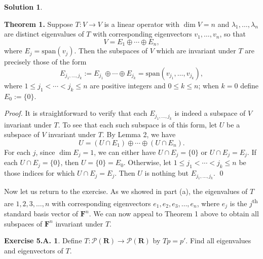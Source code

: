 \documentclass[12pt]{article}
\theoremstyle{definition}
\theoremstyle{exercise}
\newtheorem{exercise}{Exercise 5.A.}
\theoremstyle{solution}
\newtheorem*{solution}{Solution}
\newcommand{\poly}{\mathcal{P}}
\newcommand{\ts}{\textsuperscript}
\newcommand{\Span}{\text{span}}
\newcommand{\R}{\mathbf{R}}
\newcommand{\F}{\mathbf{F}}
\begin{document}
\begin{solution}
\begin{enumerate}
        \noindent \textbf{Theorem 1.} Suppose \( T : V \to V \) is a linear operator with \( \dim V = n \) and \( \lambda_1, \ldots, \lambda_n \) are distinct eigenvalues of \( T \) with corresponding eigenvectors \( v_1, \ldots, v_n \), so that
        \[
            V = E_1 \oplus \cdots \oplus E_n,
        \]
        where \( E_j = \Span(v_j) \). Then the subspaces of \( V \) which are invariant under \( T \) are precisely those of the form
        \[
            E_{j_1, \ldots, j_k} := E_{j_1} \oplus \cdots \oplus E_{j_k} = \Span(v_{j_1}, \ldots, v_{j_k}),
        \]
        where \( 1 \leq j_1 < \cdots < j_k \leq n \) are positive integers and \( 0 \leq k \leq n \); when \( k = 0 \) define \( E_0 := \{ 0 \} \).

        \noindent \textit{Proof.} It is straightforward to verify that each \( E_{j_1, \ldots, j_k} \) is indeed a subspace of \( V \) invariant under \( T \). To see that each such subspace is of this form, let \( U \) be a subspace of \( V \) invariant under \( T \). By Lemma 2, we have
        \[
            U = (U \cap E_1) \oplus \cdots \oplus (U \cap E_n).
        \]
        For each \( j \), since \( \dim E_j = 1 \), we can either have \( U \cap E_j = \{ 0 \} \) or \( U \cap E_j = E_j \). If each \( U \cap E_j = \{ 0 \} \), then \( U = \{ 0 \} = E_0 \). Otherwise, let \( 1 \leq j_1 < \cdots < j_k \leq n \) be those indices for which \( U \cap E_j = E_j \). Then \( U \) is nothing but \( E_{j_1, \ldots, j_k} \). \qed
        
        Now let us return to the exercise. As we showed in part (a), the eigenvalues of \( T \) are \( 1, 2, 3, \ldots, n \) with corresponding eigenvectors \( e_1, e_2, e_3, \ldots, e_n \), where \( e_j \) is the \( j \)\ts{th} standard basis vector of \( \F^n \). We can now appeal to Theorem 1 above to obtain all subspaces of \( \F^n \) invariant under \( T \).
    \end{enumerate}
\end{solution}

\begin{exercise}
\label{ex:11}
    Define \( T : \poly(\R) \to \poly(\R) \) by \( Tp = p' \). Find all eigenvalues and eigenvectors of \( T \).
\end{exercise}
\end{document}
